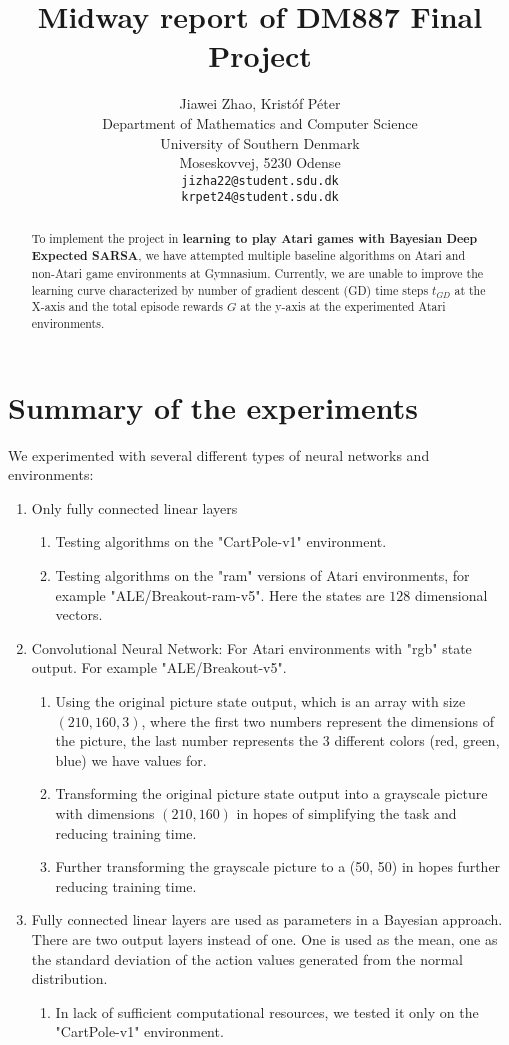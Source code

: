 \documentclass{article}
\title{Midway report of DM887 Final Project}
\author{%
  Jiawei Zhao, Kristóf Péter\\
  Department of Mathematics and Computer Science\\
  University of Southern Denmark\\
  Moseskovvej, 5230 Odense \\
  \texttt{jizha22@student.sdu.dk} \\
  \texttt{krpet24@student.sdu.dk} \\
}
\begin{document}
\maketitle


\begin{abstract}
  To implement the project in \textbf{learning to play Atari games with Bayesian Deep Expected SARSA}, we have attempted multiple baseline algorithms on Atari and non-Atari game environments at Gymnasium.
  Currently, we are unable to improve the learning curve characterized by number of gradient descent (GD) time steps $t_{GD}$ at the X-axis and the total episode rewards $G$ at the y-axis at the experimented Atari environments.
\end{abstract}

\section{Summary of the experiments}
We experimented with several different types of neural networks and environments:
\begin{enumerate}
    \item Only fully connected linear layers
    \begin{enumerate}
        \item Testing algorithms on the "CartPole-v1" environment.
        \item Testing algorithms on the "ram" versions of Atari environments, for example "ALE/Breakout-ram-v5". Here the states are $128$ dimensional vectors.
    \end{enumerate}
    \item Convolutional Neural Network: For Atari environments with "rgb" state output. For example "ALE/Breakout-v5".
    \begin{enumerate}
        \item Using the original picture state output, which is an array with size $(210, 160, 3)$, where the first two numbers represent the dimensions of the picture, the last number represents the 3 different colors (red, green, blue) we have values for.
        \item Transforming the original picture state output into a grayscale picture with dimensions $(210, 160)$ in hopes of simplifying the task and reducing training time.
        \item Further transforming the grayscale picture to a (50, 50) in hopes further reducing training time.
    \end{enumerate}
    \item Fully connected linear layers are used as parameters in a Bayesian approach. There are two output layers instead of one. One is used as the mean, one as the standard deviation of the action values generated from the normal distribution.
    \begin{enumerate}
        \item In lack of sufficient computational resources, we tested it only on the "CartPole-v1" environment.
    \end{enumerate}
\end{enumerate}
\end{document}
